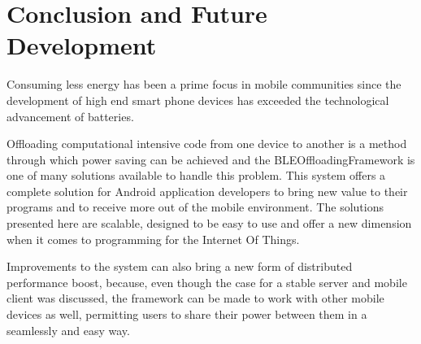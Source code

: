 \chapter{Conclusion and Future Development}
\label{chapter:conclusion}


Consuming less energy has been a prime focus in mobile communities since the development of high end smart phone devices has exceeded the technological advancement of batteries.

Offloading computational intensive code from one device to another is a method through which power saving can be achieved and the BLEOffloadingFramework is one of many solutions available to handle this problem. This system offers a complete solution for Android application developers to bring new value to their programs and to receive more out of the mobile environment. The solutions presented here are scalable, designed to be easy to use and offer a new dimension when it comes to programming for the Internet Of Things.

Improvements to the system can also bring a new form of distributed performance boost, because, even though the case for a stable server and mobile client was discussed, the framework can be made to work with other mobile devices as well, permitting users to share their power between them in a seamlessly and easy way.